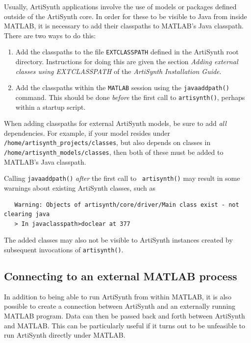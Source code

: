 \documentclass{article}
\begin{document}
Usually, ArtiSynth applications involve the use of models or packages
defined outside of the ArtiSynth core. In order for these to be
visible to Java from inside MATLAB, it is necessary to add their
classpaths to MATLAB's Java classpath. There are two ways to do this:

\begin{enumerate}

\item Add the classpaths to the file {\tt EXTCLASSPATH} defined in the
ArtiSynth root directory. Instructions for doing this are given the
section {\it Adding external classes using EXTCLASSPATH} of the {\it
ArtiSynth Installation Guide}.

\item Add the classpaths within the {\tt MATLAB} session using the
{\tt javaaddpath()} command. This should be done {\it before} the
first call to {\tt artisynth()}, perhaps within a startup script.

\end{enumerate}

\begin{sideblock}
When adding classpaths for external ArtiSynth models, be sure to add
{\it all} dependencies. For example, if your model resides under {\tt
/home/artisynth\_projects/classes}, but also depends on classes in {\tt
/home/artisynth\_models/classes}, then both of these must be added to
MATLAB's Java classpath.
\end{sideblock}

\begin{sideblock}
Calling {\tt javaaddpath()}
{\it after} the first call to {\tt
artisynth()} may result in some warnings about existing
ArtiSynth classes, such as
\begin{verbatim}
   Warning: Objects of artisynth/core/driver/Main class exist - not clearing java 
   > In javaclasspath>doclear at 377
\end{verbatim}
The added classes may also not be visible to ArtiSynth instances
created by subsequent invocations of {\tt artisynth()}.
\end{sideblock}

\subsection{Connecting to an external MATLAB process}

In addition to being able to run ArtiSynth from within MATLAB, it is
also possible to create a connection between ArtiSynth and an
externally running MATLAB program. Data can then be passed back and
forth between ArtiSynth and MATLAB. This can be particularly useful if
it turns out to be unfeasible to run ArtiSynth directly under MATLAB.
\end{document}
